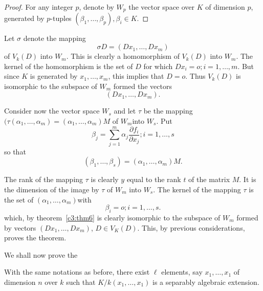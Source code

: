 \begin{proof}
For any integer $p$, denote by $W_p$ the vector space over $K$ of
dimension $p$, generated by $p$-tuples $(\beta_1, \ldots, \beta_p),
\beta_i \in K$. 
\end{proof}

Let $\sigma$ denote the mapping 
$$
\sigma D=(Dx_1, \ldots , Dx_m)
$$
of $V_k(D)$ into $W_m$. This is clearly a homomorphism of $V_k(D)$
into $W_m$. The kernel of the homomorphism is the set of $D$ for which
$Dx_i =o; i = 1, \ldots,m$. But since $K$ is generated by $x_1,
\ldots, x_m$, this implies that $D=o$. Thus $V_k(D)$ is isomorphic to
the subspace of $W_m$ formed the vectors  
$$
(Dx_1, \ldots , Dx_m).
$$

Consider now the vector space $W_s$ and let $\tau$ be the mapping \break
$(\tau(\alpha_1, \ldots, \alpha_m) = ( \alpha_1, \ldots, \alpha_m)M$
of $W_m$\pageoriginale into $W_s$. Put  
$$
\beta_j= \sum^m_{j=1} \alpha_j \frac{\partial f_i}{\partial x_j}; i=
1, \ldots,s 
$$
so that 
$$
(\beta_1, \ldots, \beta_s) =(\alpha_1, \ldots, \alpha_m)M.
$$
 
The rank of the mapping $\tau$ is clearly $y$ equal to the rank $t$ of
the matrix $M$. It is the dimension of the image by $\tau$ of $W_m$
into $W_s$. The kernel of the mapping $\tau$ is the set of $(\alpha_1,
\ldots, \alpha_m)$with  
$$
\beta_i = o; i= 1, \ldots ,s.
$$
which, by theorem~\ref{c3:thm6} is clearly isomorphic to the
subspace of $W_m$ formed by vectors $(Dx_1, \ldots,Dx_m)$, $D \in
V_K(D)$. This, by previous considerations, proves the theorem.  

We shall now prove the 

\begin{thm}\label{c3:thm9}%
 With the same notations as before, there exist $\ell$ elements, say
  $x_1, \ldots, x_1$ of dimension $n$ over $k$ such that $K/k(x_1,
  \ldots, x_1)$ is a separably algebraic extension. 
\end{thm}

